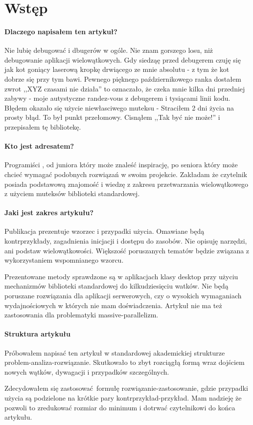 \section{Wstęp}\label{sec:introduction}
\paragraph{Dlaczego napisałem ten artykuł?}
Nie lubię debugować i dbugerów w ogóle. Nie znam gorszego losu, niż debugowanie aplikacji wielowątkowych. Gdy siedząę przed debugerem czuję się jak kot goniący laserową kropkę drwiącego ze mnie absolutu - z tym że kot dobrze się przy tym bawi.
Pewnego pięknego październikowego ranka dostałem zwrot ,,XYZ czasami nie działa'' to oznaczało, że czeka mnie kilka dni przedniej zabywy - moje autystyczne randez-vous z debugerem i tysiącami linii kodu. Błędem okazało się użycie niewłasciwego muteksu - Straciłem 2 dni życia na prosty błąd. To był punkt przełomowy. Cisnąłem ,,Tak być nie może!'' i przepisałem tę bibliotekę. 

\paragraph{Kto jest adresatem?}
Programiści \Cpp{}, od juniora który może znaleść inspirację, po seniora który może chcieć wymagać podobnych rozwiązań w swoim projekcie. Zakładam że czytelnik posiada podstawową znajomość  i wiedzę z zakresu przetwarzania wielowątkowego z użyciem muteksów biblioteki standardowej.

\paragraph{Jaki jest zakres artykułu?}
Publikacja prezentuje wzorzec  i przypadki użycia. Omawiane będą kontrprzykłady, zagadnienia inicjacji i dostępu do zasobów. Nie opisuję narzędzi, ani podstaw wielowątkowości. Większość poruszanych tematów będzie związana z wykorzystaniem wspomnianego wzorcu.

Prezentowane metody sprawdzone są w aplikacjach klasy desktop przy użyciu mechanizmów biblioteki standardowej do kilkudziesięciu watków. Nie będą poruszane rozwiązania dla aplikacji serwerowych, czy o wysokich wymaganiach wydajnościowych w których nie mam doświadczenia. Artykuł nie ma też zastosowania dla problematyki massive-parallelizm.

\paragraph{Struktura artykułu}
Próbowałem napisać ten artykuł w standardowej akademickiej strukturze problem-analiza-rozwiązanie. Skutkowało to zbyt rozciągłą formą wraz dojściem nowych wątków, dywagacji i przypadków szczególnych.

Zdecydowałem się zastosować formułę rozwiązanie-zastosowanie, gdzie przypadki użycia są podzielone na krótkie pary kontrprzykład-przykład. Mam nadzieję że pozwoli to zredukować rozmiar do minimum i dotrwać czytelnikowi do końca artykułu.
